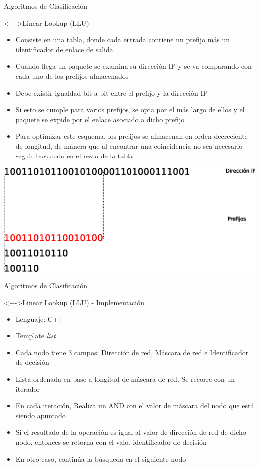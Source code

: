 \documentclass[xcolor=dvipsnames]{beamer}
\begin{document}
\begin{frame}{Algoritmos de Clasificación}
\begin{block}<+->{Linear Lookup (LLU)}   
    \begin{itemize}
      \scriptsize     	
	\item Consiste en una tabla, donde cada entrada contiene un prefijo más un identificador de enlace de salida
	\item Cuando llega un paquete se examina su dirección IP y se va comparando con cada uno de los prefijos almacenados
	\item Debe existir igualdad bit a bit entre el prefijo y la dirección IP
	\item Si esto se cumple para varios prefijos, se opta por el más largo de ellos y el paquete se expide por el enlace asociado a dicho prefijo
	\item Para optimizar este esquema, los prefijos se almacenan en orden decreciente de longitud, de manera que al encontrar una coincidencia no sea necesario seguir buscando en el resto de la tabla
    \end{itemize}
\centering 
\includegraphics[scale=0.35]{figures/prefinvert.eps}
  \end{block}
\end{frame}

\begin{frame}{Algoritmos de Clasificación}
\begin{block}<+->{Linear Lookup (LLU) - Implementación}   
    \begin{itemize}
      \scriptsize
     	
     	\item Lenguaje: C++
     	\item Template \emph{list}
     	\item Cada nodo tiene 3 campos: Dirección de red, Máscara de red e Identificador de decisión
	\item Lista ordenada en base a longitud de máscara de red. Se recorre con un iterador
	\item En cada iteración, Realiza un AND con el valor de máscara del nodo que está siendo apuntado
	\item Si el resultado de la operación es igual al valor de dirección de red de dicho nodo, entonces se retorna con el valor identificador de decisión
	\item En otro caso, continúa la búsqueda en el siguiente nodo
    \end{itemize}
  \end{block}
\end{frame}
\end{document}
